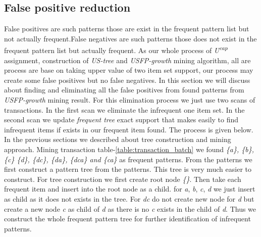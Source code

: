 	\subsection{False positive reduction}
	False positives are such patterns those are exist in the frequent pattern list but not actually frequent.False negatives are such patterns those does not exist in the frequent pattern list but actually frequent. As our whole process of \emph{U\textsuperscript{cap}} assignment, construction of \emph{US-tree} and \emph{USFP-growth} mining algorithm, all are process are base on taking upper value of two item set support, our process may create some false positives but no false negatives. In this section we will discuss about finding and eliminating all the false positives from found patterns from \emph{USFP-growth} mining result. For this elimination process we just use two scans of transactions. In the first scan we eliminate the infrequent one item set. In the second scan we update \emph{frequent tree} exact support that makes easily to find infrequent items if exists in our frequent item found. The process is given below.\\
	In the previous sections we described about tree construction and mining approach. Mining transaction table-\ref{table:transaction_batch} we found \emph{\{a\}, \{b\}, \{c\} \{d\}, \{dc\}, \{da\}, \{dca\} and \{ca\}} as frequent patterns. From the patterns we first construct a pattern tree from the patterns. This tree is very much easier to construct. For tree construction we first create root node \emph{\{\}}. Then take each frequent item and insert into the root node as a child. for \emph{a}, \emph{b}, \emph{c}, \emph{d} we just insert as child as it does not exists in the tree. For \emph{dc} do not create new node for \emph{d} but create a new node \emph{c} as child of \emph{d} as there is no \emph{c} exists in the child of \emph{d}. Thus we construct the whole frequent pattern tree for further identification of infrequent patterns. \\
